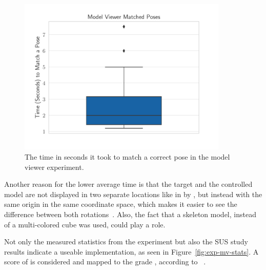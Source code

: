 \begin{figure}[H]
	\centering
	\includegraphics[width=10cm]{figures/evaluation/eval_exp_mv.pdf}
	\caption[Model viewer task results]{The time in seconds it took to match a correct pose in the model viewer experiment.}\label{fig:eval-exp-mv}
\end{figure}

Another reason for the lower average time is that the target and the controlled model are not displayed in two separate locations like in {} by \citeauthor{Katzakis.2010}, but instead with the same origin in the same coordinate space, which makes it easier to see the difference between both rotations~\cite[140]{Katzakis.2010}. Also, the fact that a skeleton model, instead of a multi-colored cube was used, could play a role.

Not only the measured statistics from the experiment but also the \gls{SUS} study results indicate a useable implementation, as seen in Figure~\ref{fig:exp-mv-stats}. A score of \evalExpMvSusScore{} is considered \evalExpMvSusAdj{} and mapped to the grade \evalExpMvSusGrade, according to \citeauthor{Bangor.2009}~\cite[120\psq]{Bangor.2009}.

